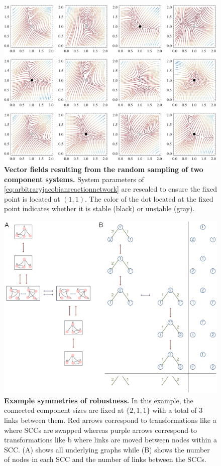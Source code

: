 
\begin{figure}[!ht]
\centering
\noindent\includegraphics[width=0.9\columnwidth]{fig/jacobianvectorfields.pdf}
\caption{{\bf Vector fields resulting from the random sampling of two component systems.} System parameters of \ref{eq:arbitraryjacobianreactionnetwork} are rescaled to ensure the fixed point is located at $(1,1)$. The color of the dot located at the fixed point indicates whether it is stable (black) or unstable (gray).}
\label{fig:jacobianvectorfields}
\end{figure}

\pagebreak

\begin{figure}[!ht]
\centering
\noindent\includegraphics[width=0.9\columnwidth]{fig/robustnesssymmetries.pdf}
\caption{{\bf Example symmetries of robustness.} In this example, the connected component sizes are fixed at $\{2,1,1\}$ with a total of $3$ links between them. Red arrows correspond to transformations like  a where SCCs are swapped whereas purple arrows correspond to transformations like  b where links are moved between nodes within a SCC. (A) shows all underlying graphs while (B) shows the number of nodes in each SCC and the number of links between the SCCs.}
\label{fig:robustnesssymmetries}
\end{figure}

